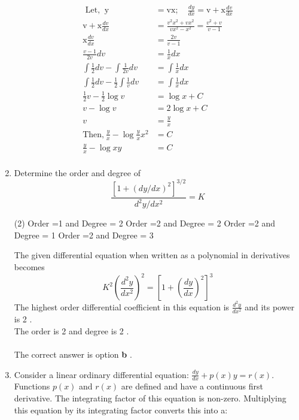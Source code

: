 \begin{enumerate}[label=\color{ocre}\textbf{\arabic*.}]
\begin{answer}
	\begin{align*}
\text {  Let, }\ \mathrm{y}&=\mathrm{v} \mathrm{x} ; \quad  \frac{d y}{d x}=\mathrm{v}+\mathrm{x} \frac{d v}{d x}\\
\mathrm{v}+\mathrm{x} \frac{d v}{d x}&=\frac{v^{2}x^{2}+v x^{2}}{v x^{2}-x^{2}}=\frac{v^{2}+v }{v -1}\\
\mathrm{x} \frac{d v}{d x}&=\frac{2v}{v-1}\\
\frac{v-1}{2v}{d v}&=\frac{1}{x}{d x}\\
\int \frac{1}{2} dv-\int \frac{1}{2v} dv&=\int \frac{1}{x} dx\\
\int \frac{1}{2} dv- \frac{1}{2}\int\frac{1}{v} dv&=\int \frac{1}{x} dx\\
 \frac{1}{2}v- \frac{1}{2}\log{v} &=\log{x}+C\\
 v- \log{v} &=2\log{x}+C\\
 v&=\frac{y}{x}\\
 \text{Then,}\ \frac{y}{x}-\log{{\frac{y}{x}}x^{2}}&=C\\
\frac{y}{x}-\log{xy}&=C\\
\end{align*}
\end{answer}
\item  Determine the order and degree of
$$
\frac{\left[1+(d y / d x)^{2}\right]^{3 / 2}}{d^{2} y / d x^{2}}=K
$$
\begin{tasks}(2)
	\task[\textbf{a.}] Order =1 and Degree = 2
	\task[\textbf{b.}] Order =2 and Degree = 2
	\task[\textbf{c.}] Order =2 and Degree = 1
	\task[\textbf{d.}]Order =2 and Degree = 3
\end{tasks}
\begin{answer}
	 The given differential equation when written as a polynomial in derivatives becomes
	$$
	K^{2}\left(\frac{d^{2} y}{d x^{2}}\right)^{2}=\left[1+\left(\frac{d y}{d x}\right)^{2}\right]^{3}
	$$
	The highest order differential coefficient in this
	equation is $\frac{d^{2} y}{d x^{2}}$ and its power is 2 .
	\\The order is 2 and degree is 2 .\\\\The correct answer is option \textbf{b} .
\end{answer}
\item Consider a linear ordinary differential equation:
$\frac{d y}{d x}+p(x) y=r(x)$. Functions $p(x)$ and $r(x)$ are defined and have a continuous first derivative. The integrating factor of this equation is non-zero. Multiplying this equation by its integrating factor converts this into a:


\end{enumerate}
